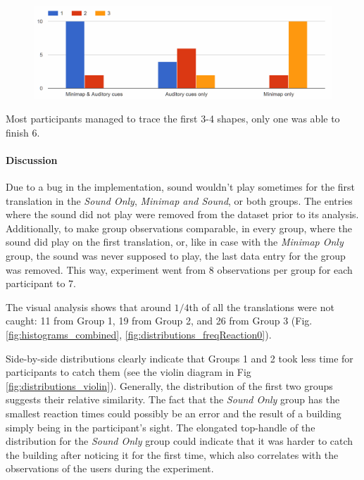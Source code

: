 \begin{figure}
	\centering
	\includegraphics[width=0.7\linewidth]{figures/final_study_awareness_presentation_user_preference}
	\caption{}
	\label{fig:finalstudyawarenesspresentationuserpreference}
\end{figure}

Most participants managed to trace the first 3-4 shapes, only one was able to finish 6.

\paragraph{Discussion}
Due to a bug in the implementation, sound wouldn't play sometimes for the first translation in the \textit{Sound Only}, \textit{Minimap and Sound}, or both groups. The entries where the sound did not play were removed from the dataset prior to its analysis. Additionally, to make group observations comparable, in every group, where the sound did play on the first translation, or, like in case with the \textit{Minimap Only} group, the sound was never supposed to play, the last data entry for the group was removed. This way, experiment went from 8 observations per group for each participant to 7.

The visual analysis shows that around $1/4$th of all the translations were not caught: 11 from Group 1, 19 from Group 2, and 26 from Group 3 (Fig. \ref{fig:histograms_combined}, \ref{fig:distributions_freqReaction0}).

Side-by-side distributions clearly indicate that Groups 1 and 2 took less time for participants to catch them (see the violin diagram in Fig \ref{fig:distributions_violin}). Generally, the distribution of the first two groups suggests their relative similarity. The fact that the \textit{Sound Only} group has the smallest reaction times could possibly be an error and the result of a building simply being in the participant's sight. The elongated top-handle of the distribution for the \textit{Sound Only} group could indicate that it was harder to catch the building after noticing it for the first time, which also correlates with the observations of the users during the experiment.

